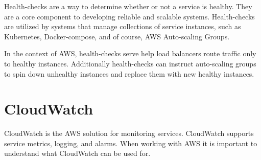 \documentclass{csse4400}
\begin{document}
Health-checks are a way to determine whether or not a service is healthy.
They are a core component to developing reliable and scalable systems.
Health-checks are utilized by systems that manage collections of service instances,
such as Kubernetes, Docker-compose, and of course, AWS Auto-scaling Groups.

In the context of AWS,
health-checks serve help load balancers route traffic only to healthy instances.
Additionally health-checks can instruct auto-scaling groups to spin down unhealthy instances and replace them with new healthy instances.





\section{CloudWatch}


CloudWatch is the AWS solution for monitoring services.
CloudWatch supports service metrics, logging, and alarms.
When working with AWS it is important to understand what CloudWatch can be used for.

\end{document}

